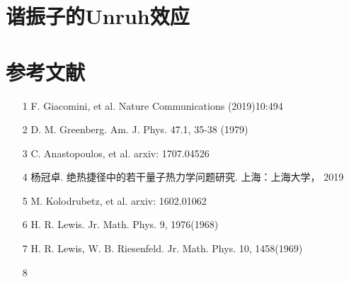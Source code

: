 \documentclass[a4paper]{article}
\begin{document}
    \section{谐振子的Unruh效应}


    \section*{参考文献}
    \begin{itemize}
        \item[1] F. Giacomini, et al. Nature Communications (2019)10:494
        \item[2] D. M. Greenberg. Am. J. Phys. 47.1, 35-38 (1979)
        \item[3] C. Anastopoulos, et al. arxiv: 1707.04526
        \item[4] 杨冠卓. 绝热捷径中的若干量子热力学问题研究. 上海：上海大学， 2019
        \item[5] M. Kolodrubetz, et al. arxiv: 1602.01062
        \item[6] H. R. Lewis. Jr. Math. Phys. 9, 1976(1968) 
        \item[7] H. R. Lewis, W. B. Riesenfeld. Jr. Math. Phys. 10, 1458(1969)
        \item[8] 
    \end{itemize}
\end{document}

